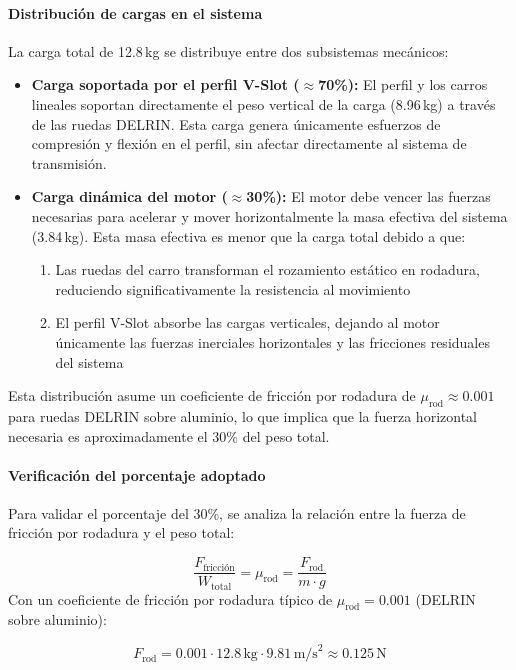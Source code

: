 \paragraph{Distribución de cargas en el sistema}
La carga total de 12.8\,kg se distribuye entre dos subsistemas mecánicos:

\begin{itemize}
    \item \textbf{Carga soportada por el perfil V-Slot ($\approx$70\%):} El perfil y los carros lineales soportan directamente el peso vertical de la carga (8.96\,kg) a través de las ruedas DELRIN. Esta carga genera únicamente esfuerzos de compresión y flexión en el perfil, sin afectar directamente al sistema de transmisión.
    
    \item \textbf{Carga dinámica del motor ($\approx$30\%):} El motor debe vencer las fuerzas necesarias para acelerar y mover horizontalmente la masa efectiva del sistema (3.84\,kg). Esta masa efectiva es menor que la carga total debido a que:
    \begin{enumerate}
        \item Las ruedas del carro transforman el rozamiento estático en rodadura, reduciendo significativamente la resistencia al movimiento
        \item El perfil V-Slot absorbe las cargas verticales, dejando al motor únicamente las fuerzas inerciales horizontales y las fricciones residuales del sistema
    \end{enumerate}
\end{itemize}

Esta distribución asume un coeficiente de fricción por rodadura de $\mu_{\text{rod}} \approx 0.001$ para ruedas DELRIN sobre aluminio, lo que implica que la fuerza horizontal necesaria es aproximadamente el 30\% del peso total.

\paragraph{Verificación del porcentaje adoptado}
Para validar el porcentaje del 30\%, se analiza la relación entre la fuerza de fricción por rodadura y el peso total:

\[\frac{F_{\text{fricción}}}{W_{\text{total}}} = \mu_{\text{rod}} = \frac{F_{\text{rod}}}{m \cdot g}\]
Con un coeficiente de fricción por rodadura típico de $\mu_{\text{rod}} = 0.001$ (DELRIN sobre aluminio):

\[F_{\text{rod}} = 0.001 \cdot 12.8\,\text{kg} \cdot 9.81\,\text{m/s}^2 \approx 0.125\,\text{N}\]

